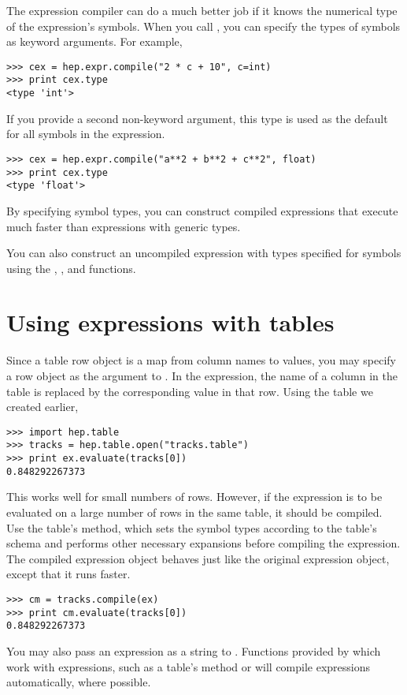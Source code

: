 The expression compiler can do a much better job if it knows the
numerical type of the expression's symbols.  When you call
, you can specify the types of symbols as keyword
arguments.  For example,
\begin{verbatim}
>>> cex = hep.expr.compile("2 * c + 10", c=int)
>>> print cex.type
<type 'int'>
\end{verbatim}
If you provide a second non-keyword argument, this type is used as the
default for all symbols in the expression.
\begin{verbatim}
>>> cex = hep.expr.compile("a**2 + b**2 + c**2", float)
>>> print cex.type
<type 'float'>
\end{verbatim}
By specifying symbol types, you can construct compiled expressions that
execute much faster than expressions with generic types.

You can also construct an uncompiled expression with types specified for
symbols using the ,
, and 
functions.


\section{Using expressions with tables}

Since a table row object is a map from column names to values, you may
specify a row object as the argument to .  In the
expression, the name of a column in the table is replaced by the
corresponding value in that row.  Using the  table we
created earlier,
\begin{verbatim}
>>> import hep.table
>>> tracks = hep.table.open("tracks.table")
>>> print ex.evaluate(tracks[0])
0.848292267373
\end{verbatim}

This works well for small numbers of rows.  However, if the expression
is to be evaluated on a large number of rows in the same table, it
should be compiled.  Use the table's  method, which sets
the symbol types according to the table's schema and performs other
necessary expansions before compiling the expression.  The compiled
expression object behaves just like the original expression object,
except that it runs faster.
\begin{verbatim}
>>> cm = tracks.compile(ex)
>>> print cm.evaluate(tracks[0])
0.848292267373
\end{verbatim}
You may also pass an expression as a string to .
Functions provided by \pyhep which work with expressions, such as a
table's  method or  will
compile expressions automatically, where possible.  


